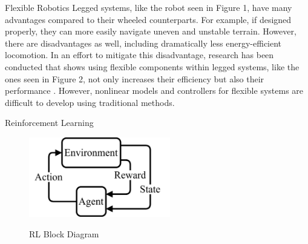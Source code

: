 \documentclass[final]{beamer}
\newlength{\onecolwid}
\begin{document}
\begin{frame}[t]
\begin{columns}[t]
\begin{column}{\onecolwid}
\begin{block}{Flexible Robotics}
Legged systems, like the robot seen in Figure 1, have many advantages compared to their wheeled counterparts. For example, if designed properly, they can more easily navigate uneven and unstable terrain. However, there are disadvantages as well, including dramatically less energy-efficient locomotion. In an effort to mitigate this disadvantage, research has been conducted that shows using flexible components within legged systems, like the ones seen in Figure 2, not only increases their efficiency but also their performance \cite{Sugiyama2004}. However, nonlinear models and controllers for flexible systems are difficult to develop using traditional methods. 

%
\end{block}




\begin{block}{Reinforcement Learning}
%
\begin{figure}
    \captionsetup{justification=centering, labelformat=simple}
    \begin{center}
        \vspace{-0.25 in}
        \includegraphics[width=0.55\textwidth]{figures/RL.png}
        \caption{RL Block Diagram}
        \vspace{-0.35 in}
        \label{fig:RL Block Diagram}
    \end{center}
\end{figure}
%


\end{block}
\end{column}
\end{columns}
\end{frame}
\end{document}
